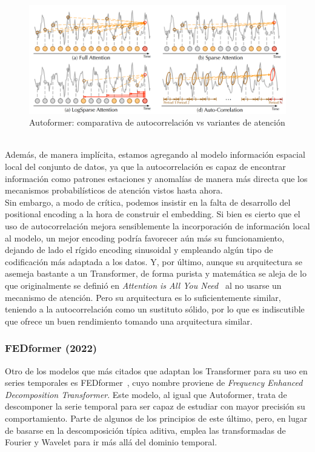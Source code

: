 \begin{figure}[!ht]
    \centering
    \includegraphics[scale=0.25]{img/muestreo.png}
    \caption{Autoformer: comparativa de autocorrelación vs variantes de atención ~\cite{wu2022autoformerdecompositiontransformersautocorrelation}}
    \label{muestreo}
\end{figure}

Además, de manera implícita, estamos agregando al modelo información espacial local del conjunto de datos, ya que la autocorrelación es capaz de encontrar información como patrones estaciones y anomalías de manera más directa que los mecanismos probabilísticos de atención vistos hasta ahora.\\

Sin embargo, a modo de crítica, podemos insistir en la falta de desarrollo del positional encoding a la hora de construir el embedding. Si bien es cierto que el uso de autocorrelación mejora sensiblemente la incorporación de información local al modelo, un mejor encoding podría favorecer aún más su funcionamiento, dejando de lado el rígido encoding sinusoidal y empleando algún tipo de codificación más adaptada a los datos. Y, por último, aunque su arquitectura se asemeja bastante a un Transformer, de forma purista y matemática se aleja de lo que originalmente se definió en \textit{Attention is All You Need}~\cite{vaswani2023attentionneed} al no usarse un mecanismo de atención. Pero su arquitectura es lo suficientemente similar, teniendo a la autocorrelación como un sustituto sólido, por lo que es indiscutible que ofrece un buen rendimiento tomando una arquitectura similar.

\subsubsection{FEDformer (2022)}

Otro de los modelos que más citados que adaptan los Transformer para su uso en series temporales es FEDformer~\cite{zhou2022fedformerfrequencyenhanceddecomposed}, cuyo nombre proviene de \textit{Frequency Enhanced Decomposition Transformer}. Este modelo, al igual que Autoformer, trata de descomponer la serie temporal para ser capaz de estudiar con mayor precisión su comportamiento. Parte de algunos de los principios de este último, pero, en lugar de basarse en la descomposición típica aditiva, emplea las transformadas de Fourier y Wavelet para ir más allá del dominio temporal.\\

